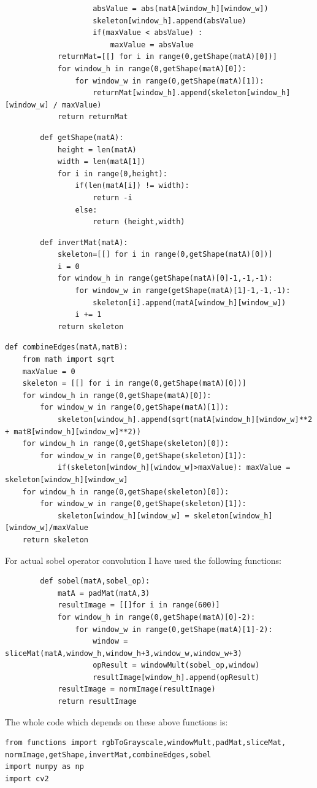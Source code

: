 \documentclass[12pt]{article}
\newenvironment{QandA}
{
	\begin{enumerate}[label=\normalfont\arabic*.,leftmargin=2em,rightmargin=2em]\normalfont
	}
	{
	\end{enumerate}
}
\newenvironment{codelalala}{}{}
\newenvironment{answered}{\setlength{\parindent}{1em}\par\normalfont}{}
\begin{document}
\begin{QandA}
\begin{answered}
\begin{codelalala}
\begin{verbatim}
        		    absValue = abs(matA[window_h][window_w])
		            skeleton[window_h].append(absValue)     
        		    if(maxValue < absValue) : 
        		    	maxValue = absValue
			returnMat=[[] for i in range(0,getShape(matA)[0])]
		    for window_h in range(0,getShape(matA)[0]):
        		for window_w in range(0,getShape(matA)[1]):
            		returnMat[window_h].append(skeleton[window_h][window_w] / maxValue)
    		return returnMat
		\end{verbatim}
		\begin{verbatim}
		def getShape(matA):
    		height = len(matA)
    		width = len(matA[1])
    		for i in range(0,height):
        		if(len(matA[i]) != width):
            		return -i
        		else:
            		return (height,width)
		\end{verbatim}	
    	\begin{verbatim}
		def invertMat(matA):
    		skeleton=[[] for i in range(0,getShape(matA)[0])]
    		i = 0
    		for window_h in range(getShape(matA)[0]-1,-1,-1):
        		for window_w in range(getShape(matA)[1]-1,-1,-1):
            		skeleton[i].append(matA[window_h][window_w])
       			i += 1
    		return skeleton
		\end{verbatim}
		\begin{verbatim}
def combineEdges(matA,matB):
    from math import sqrt
    maxValue = 0
    skeleton = [[] for i in range(0,getShape(matA)[0])]
    for window_h in range(0,getShape(matA)[0]):
        for window_w in range(0,getShape(matA)[1]):
            skeleton[window_h].append(sqrt(matA[window_h][window_w]**2 + matB[window_h][window_w]**2))
    for window_h in range(0,getShape(skeleton)[0]):
        for window_w in range(0,getShape(skeleton)[1]):
            if(skeleton[window_h][window_w]>maxValue): maxValue = skeleton[window_h][window_w]
    for window_h in range(0,getShape(skeleton)[0]):
        for window_w in range(0,getShape(skeleton)[1]):
            skeleton[window_h][window_w] = skeleton[window_h][window_w]/maxValue
    return skeleton
\end{verbatim}
		For actual sobel operator convolution I have used the following functions:
		\begin{verbatim}
		def sobel(matA,sobel_op):
    		matA = padMat(matA,3)
    		resultImage = [[]for i in range(600)]
    		for window_h in range(0,getShape(matA)[0]-2):
        		for window_w in range(0,getShape(matA)[1]-2):
            		window = sliceMat(matA,window_h,window_h+3,window_w,window_w+3)
            		opResult = windowMult(sobel_op,window)
            		resultImage[window_h].append(opResult)
    		resultImage = normImage(resultImage)
    		return resultImage
		\end{verbatim}
		The whole code which depends on these above functions is:
		\begin{verbatim}
from functions import rgbToGrayscale,windowMult,padMat,sliceMat,
normImage,getShape,invertMat,combineEdges,sobel
import numpy as np
import cv2


\end{verbatim}
\end{codelalala}
\end{answered}
\end{QandA}
\end{document}
